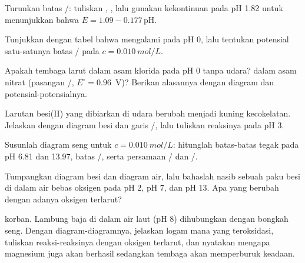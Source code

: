 \begin{exercise}[$\star\star$]\label{exo:b1:e-ph-diagrams:6}
Turunkan batas /: tuliskan ,
, lalu gunakan kekontinuan pada pH 1.82 untuk
menunjukkan bahwa $E = 1.09 -
0.177\,\mathrm{pH}$.
\end{exercise}

\begin{exercise}[$\star\star$]\label{exo:b1:e-ph-diagrams:7}
Tunjukkan dengan tabel  bahwa  mengalami
 pada pH 0, lalu tentukan potensial satu-satunya batas
/ pada $c = \qty{0.010}{mol/L}$.
\end{exercise}

\begin{exercise}[$\star\star$]\label{exo:b1:e-ph-diagrams:8}
Apakah tembaga larut dalam asam klorida pada pH 0 tanpa udara? dalam asam
nitrat (pasangan /, $E^\circ = 0.96$~V)? Berikan alasannya
dengan diagram dan potensial-potensialnya.
\end{exercise}

\begin{exercise}[$\star\star$]\label{exo:b1:e-ph-diagrams:9}
Larutan besi(II) yang dibiarkan di udara berubah menjadi kuning
kecokelatan. Jelaskan dengan diagram besi dan garis /,
lalu tuliskan reaksinya pada pH 3.
\end{exercise}

\begin{exercise}[$\star\star\star$]\label{exo:b1:e-ph-diagrams:10}
Susunlah diagram seng untuk $c = \qty{0.010}{mol/L}$: hitunglah
batas-batas tegak pada pH 6.81 dan 13.97, batas /, serta
persamaan / dan /.
\end{exercise}

\begin{exercise}[$\star\star\star$]\label{exo:b1:e-ph-diagrams:11}
Tumpangkan diagram besi dan diagram air, lalu bahaslah nasib sebuah paku
besi di dalam air bebas oksigen pada pH 2, pH 7, dan pH 13. Apa yang
berubah dengan adanya oksigen terlarut?
\end{exercise}

\begin{exercise}[$\star\star\star$]\label{exo:b1:e-ph-diagrams:12}
 korban. Lambung baja di dalam air laut (pH 8) dihubungkan dengan
bongkah seng. Dengan diagram-diagramnya, jelaskan logam mana yang
teroksidasi, tuliskan reaksi-reaksinya dengan oksigen terlarut, dan
nyatakan mengapa magnesium juga akan berhasil sedangkan tembaga akan
memperburuk keadaan.
\end{exercise}

